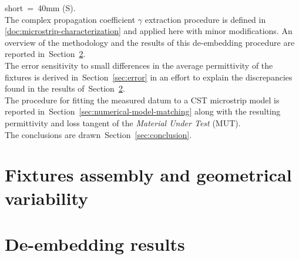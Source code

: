 \documentclass[11pt,a4paper]{article}
\newcommand{\sref}[1]{Section~\ref{#1}}
\begin{document}
    short~=~40mm (S).\\
    The complex propagation coefficient $\gamma$ extraction procedure is defined in \ref{doc:microstrip-characterization} and
    applied here with minor modifications.
    An overview of the methodology and the results of this de-embedding procedure are reported in~\sref{sec:de-embedding}.\\
    The error sensitivity to small differences in the average permittivity of the fixtures is derived in~\sref{sec:error}
    in an effort to explain the discrepancies found in the results of~\sref{sec:de-embedding}.\\
    The procedure for fitting the measured datum to a CST microstrip model is reported in~\sref{sec:numerical-model-matching}
    along with the resulting permittivity and loss tangent of the \emph{Material Under Test} (MUT).\\
    The conclusions are drawn~\sref{sec:conclusion}.


    \section{Fixtures assembly and geometrical variability}
    \label{sec:assembly}


    \section{De-embedding results}
    \label{sec:de-embedding}
\end{document}
